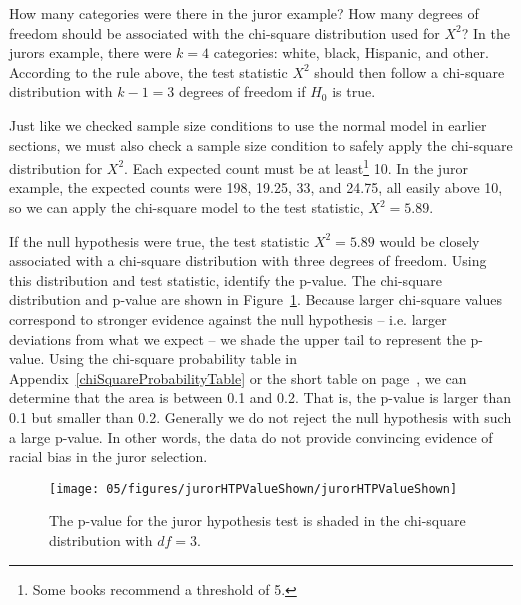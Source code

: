 \begin{example}{How many categories were there in the juror example? How many degrees of freedom should be associated with the chi-square distribution used for $X^2$?}
In the jurors example, there were $k=4$ categories: white, black, Hispanic, and other. According to the rule above, the test statistic $X^2$ should then follow a chi-square distribution with $k-1 = 3$ degrees of freedom if $H_0$ is true.
\end{example}

Just like we checked sample size conditions to use the normal model in earlier sections, we must also check a sample size condition to safely apply the chi-square distribution for $X^2$. Each expected count must be at least\footnote{Some books recommend a threshold of 5.} 10. In the juror example, the expected counts were 198, 19.25, 33, and 24.75, all easily above 10, so we can apply the chi-square model to the test statistic, $X^2=5.89$.

\begin{example}{If the null hypothesis were true, the test statistic $X^2=5.89$ would be closely associated with a chi-square distribution with three degrees of freedom. Using this distribution and test statistic, identify the p-value.}
The chi-square distribution and p-value are shown in Figure~\ref{jurorHTPValueShown}. Because larger chi-square values correspond to stronger evidence against the null hypothesis -- i.e. larger deviations from what we expect -- we shade the upper tail to represent the p-value. Using the chi-square probability table in Appendix~\ref{chiSquareProbabilityTable} or the short table on page~\pageref{chiSquareProbabilityTableShort}, we can determine that the area is between 0.1 and 0.2. That is, the p-value is larger than 0.1 but smaller than 0.2. Generally we do not reject the null hypothesis with such a large p-value. In other words, the data do not provide convincing evidence of racial bias in the juror selection.
\end{example}

\begin{figure}
\centering
\texttt{[image: 05/figures/jurorHTPValueShown/jurorHTPValueShown]}
\caption{The p-value for the juror hypothesis test is shaded in the chi-square distribution with $df=3$.}
\label{jurorHTPValueShown}
\end{figure}

